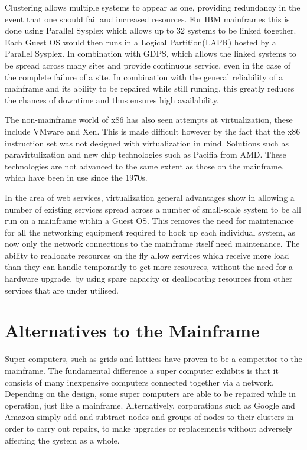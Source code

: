 \documentclass[a4paper,12pt]{article}
\begin{document}
Clustering allows multiple systems to appear as one, providing redundancy in
the event that one should fail and increased resources. For IBM mainframes this
is done using Parallel Sysplex\cite{m5} which allows up to 32 systems to be linked
together. Each Guest OS would then runs in a Logical Partition(LAPR) hosted by a
Parallel Sysplex. In combination with GDPS\cite{m6}, which allows the linked systems
to be spread across many sites and provide continuous service, even in the case
of the complete failure of a site. In combination with the general reliability
of a mainframe and its ability to be repaired while still running, this greatly
reduces the chances of downtime and thus ensures high availability.

The non-mainframe world of x86 has also seen attempts at virtualization, these
include VMware and Xen. This is made difficult however by the fact that
the x86 instruction set was not designed with virtualization in mind\cite{m7}.
Solutions such as paravirtulization and new chip technologies such as
Pacifia\cite{m8} from AMD. These technologies are not advanced to the same extent as
those on the mainframe, which have been in use since the 1970s\cite{m3}.

In the area of web services, virtualization general advantages show in allowing
a number of existing services spread across a number of small-scale system to
be all run on a mainframe within a Guest OS. This removes the need for
maintenance for all the networking equipment required to hook up each individual
system, as now only the network connections to the mainframe itself need
maintenance. The ability to reallocate resources on the fly allow services which
receive more load than they can handle temporarily to get more resources,
without the need for a hardware upgrade, by using spare capacity or
deallocating resources from other services that are under utilised.

\section{Alternatives to the Mainframe}

Super computers, such as grids and lattices have proven to be a
competitor to the mainframe. The fundamental difference a super computer
exhibits is that it consists of many inexpensive computers connected
together via a network. Depending on the design, some super computers 
are able to be repaired while in operation, just like a mainframe. 
Alternatively, corporations such as Google and Amazon simply add and 
subtract nodes and groups of nodes to their clusters in order to 
carry out repairs, to make upgrades or replacements without adversely 
affecting the system as a whole.
\end{document}
